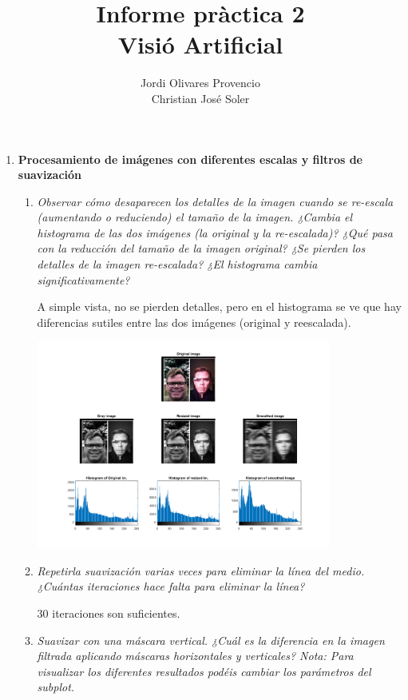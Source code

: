\documentclass{article}
\title{Informe pràctica 2\\Visió Artificial}
\author{Jordi Olivares Provencio\\Christian José Soler}
\begin{document}
\maketitle

\begin{enumerate}

 \item \textbf{Procesamiento de imágenes con diferentes escalas y filtros 
de suavización}

 \begin{enumerate}

 \item \textit{Observar  cómo  desaparecen  los  detalles  de  la  imagen  cuando  se  re-escala 
(aumentando o reduciendo) el  tamaño de la imagen. ¿Cambia el histograma de 
las  dos imágenes  (la  original  y la  re-escalada)?  ¿Qué  pasa  con la  reducción  del 
tamaño de la imagen original? ¿Se pierden los detalles de la imagen re-escalada? 
¿El histograma cambia significativamente? }
 
 A simple vista, no se pierden detalles, pero en el histograma se ve que hay diferencias sutiles entre las dos imágenes (original y reescalada). 

  \begin{center}
 \includegraphics[width=0.8\textwidth]{1a.png}
 \end{center}

 \item \textit{Repetirla suavización varias veces para eliminar la línea del medio. ¿Cuántas iteraciones hace falta para eliminar la línea?}

 30 iteraciones son suficientes.

 \item \textit{Suavizar  con  una  máscara  vertical.  ¿Cuál  es  la  diferencia  en  la  imagen  filtrada 
aplicando  máscaras  horizontales  y  verticales? Nota: Para  visualizar  los 
diferentes resultados podéis cambiar los parámetros del subplot.}


\end{enumerate}
\end{enumerate}
\end{document}
